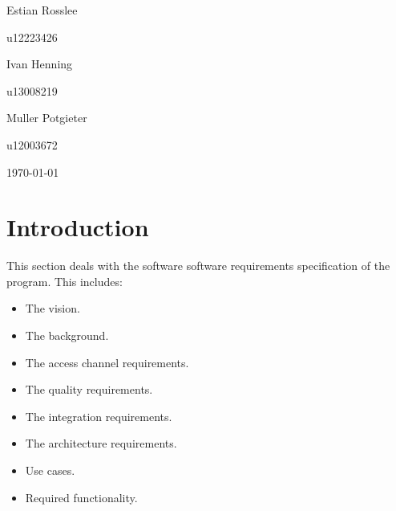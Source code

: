 \documentclass[hidelinks,a4paper,12pt]{article}
\begin{document}
\begin{titlepage}
\begin{center}
\begin{minipage}{0.4\textwidth}
\begin{flushleft} \large
Estian {Rosslee}
\end{flushleft}
\end{minipage}
\begin{minipage}{0.4\textwidth}
\begin{flushright} \large
\emph{}
u12223426
\end{flushright}
\end{minipage}

\begin{minipage}{0.4\textwidth}
\begin{flushleft} \large
Ivan {Henning}
\end{flushleft}
\end{minipage}
\begin{minipage}{0.4\textwidth}
\begin{flushright} \large
\emph{}
u13008219
\end{flushright}
\end{minipage}

\begin{minipage}{0.4\textwidth}
\begin{flushleft} \large
Muller {Potgieter}
\end{flushleft}
\end{minipage}
\begin{minipage}{0.4\textwidth}
\begin{flushright} \large
\emph{}
u12003672
\end{flushright}
\end{minipage}

\vfill
{\large \today}
\end{center}
\end{titlepage}
\footnotesize
%
\normalsize


\tableofcontents
\newpage
{}

\newpage
\section{Introduction} This section deals with the software software requirements specification of the program. This includes:
	\begin{itemize} 
		\item The vision.
		\item The background.
		\item The access channel requirements.
		\item The quality requirements.
		\item The integration requirements.
		\item The architecture requirements.
		\item Use cases.
		\item Required functionality.
	\end{itemize}
	
\end{document}

